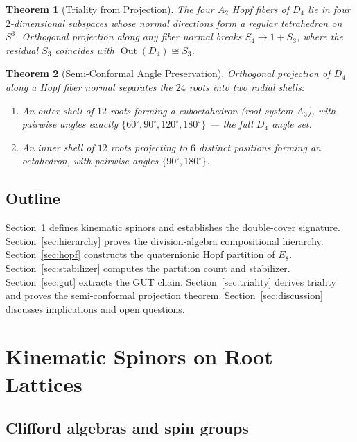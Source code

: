 \documentclass[11pt,reqno]{amsart}
\theoremstyle{plain}
\newtheorem{theorem}{Theorem}[section]
\theoremstyle{definition}
\theoremstyle{remark}
\DeclareMathOperator{\Out}{Out}
\begin{document}
\begin{theorem}[Triality from Projection]\label{thm:D}
The four $A_2$ Hopf fibers of $D_4$ lie in four
$2$-dimensional subspaces whose normal directions form a
regular tetrahedron on $S^3$.
Orthogonal projection along any fiber normal breaks
$S_4 \to 1 + S_3$, where the residual $S_3$ coincides with
$\Out(D_4) \cong S_3$.
\end{theorem}

\begin{theorem}[Semi-Conformal Angle Preservation]
\label{thm:E}
Orthogonal projection of $D_4$ along a Hopf fiber normal
separates the $24$ roots into two radial shells:
\begin{enumerate}[label=(\alph*)]
\item An outer shell of $12$ roots forming a
  cuboctahedron (root system $A_3$), with pairwise angles
  exactly $\{60^\circ, 90^\circ, 120^\circ, 180^\circ\}$
  --- the full $D_4$ angle set.
\item An inner shell of $12$ roots projecting to $6$ distinct
  positions forming an octahedron, with pairwise angles
  $\{90^\circ, 180^\circ\}$.
\end{enumerate}
\end{theorem}

\subsection{Outline}

Section~\ref{sec:spinor} defines kinematic spinors and
establishes the double-cover signature.
Section~\ref{sec:hierarchy} proves the division-algebra
compositional hierarchy.
Section~\ref{sec:hopf} constructs the quaternionic Hopf
partition of $E_8$.
Section~\ref{sec:stabilizer} computes the partition count
and stabilizer.
Section~\ref{sec:gut} extracts the GUT chain.
Section~\ref{sec:triality} derives triality and proves the
semi-conformal projection theorem.
Section~\ref{sec:discussion} discusses implications and open
questions.


\section{Kinematic Spinors on Root Lattices}
\label{sec:spinor}

\subsection{Clifford algebras and spin groups}
\end{document}
